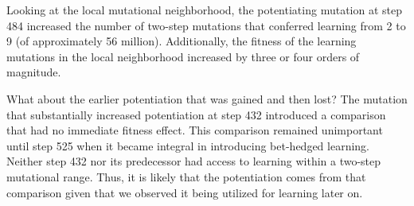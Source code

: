 Looking at the local mutational neighborhood, the potentiating mutation at step 484 increased the number of two-step mutations that conferred learning from 2 to 9 (of approximately 56 million). 
Additionally, the fitness of the learning mutations in the local neighborhood increased by three or four orders of magnitude.

What about the earlier potentiation that was gained and then lost?
The mutation that substantially increased potentiation at step 432  introduced a comparison that had no immediate fitness effect. 
This comparison remained unimportant until step 525 when it became integral in introducing bet-hedged learning.%
Neither step 432 nor its predecessor had access to learning within a two-step mutational range.
Thus, it is likely that the potentiation comes from that comparison given that we observed it being utilized for learning later on.


